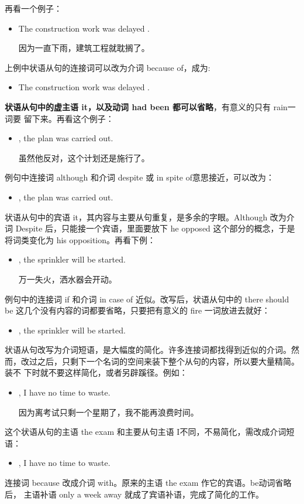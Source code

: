 再看一个例子：
\begin{itemize}
\item The construction work was delayed .

  因为一直下雨，建筑工程就耽搁了。
\end{itemize}
上例中状语从句的连接词可以改为介词 because of，成为:
\begin{itemize}
\item The construction work was delayed .
\end{itemize}
\textbf{状语从句中的虚主语 it，以及动词 had been 都可以省略}，有意义的只有 rain一词要
留下来。再看这个例子：
\begin{itemize}
\item {}, the plan was carried out.

  虽然他反对，这个计划还是施行了。
\end{itemize}
例句中连接词 although 和介词 despite 或 in spite of意思接近，可以改为：
\begin{itemize}
\item {}, the plan was carried out.
\end{itemize}
状语从句中的宾语 it，其内容与主要从句重复，是多余的字眼。Although
改为介词 Despite 后，只能接一个宾语，里面要放下 he opposed
这个部分的概念，于是将词类变化为 his opposition。再看下例：
\begin{itemize}
\item {}, the sprinkler will be started.

  万一失火，洒水器会开动。
\end{itemize}
例句中的连接词 if 和介词 in case of 近似。改写后，状语从句中的 there
should be 这几个没有内容的词都要省略，只要把有意义的 fire
一词放进去就好：
\begin{itemize}
\item {}, the sprinkler will be started.
\end{itemize}

状语从句改写为介词短语，是大幅度的简化。许多连接词都找得到近似的介词。然
而，改过之后，只剩下一个名词的空间来装下整个从句的内容，所以要大量精简。装不
下时就不要这样简化，或者另辟蹊径。例如：
\begin{itemize}
\item {}   , I have no time to waste.

  因为离考试只剩一个星期了，我不能再浪费时间。
\end{itemize}
这个状语从句的主语 the exam 和主要从句主语 I不同，不易简化，需改成介词短
语：
\begin{itemize}
\item {}  , I have
  no time to waste.
\end{itemize}
连接词 because 改成介词 with。原来的主语 the exam 作它的宾语。be动词省略后，
主语补语 only a week away 就成了宾语补语，完成了简化的工作。


